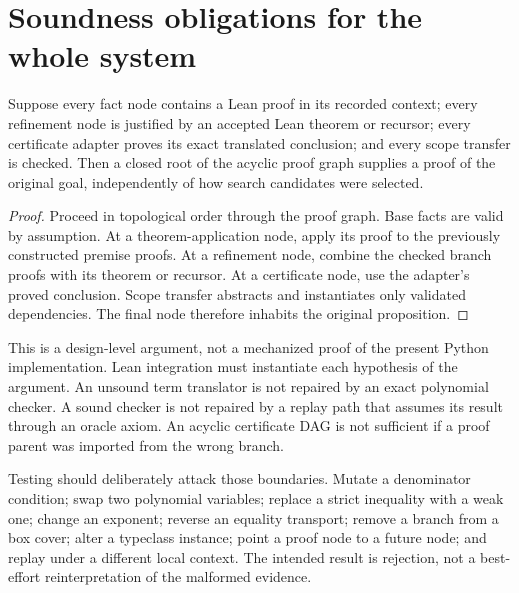 \section{Soundness obligations for the whole system}

\begin{proposition}
Suppose every fact node contains a Lean proof in its recorded context; every
refinement node is justified by an accepted Lean theorem or recursor; every
certificate adapter proves its exact translated conclusion; and every scope
transfer is checked. Then a closed root of the acyclic proof graph supplies a
proof of the original goal, independently of how search candidates were
selected.
\end{proposition}
\begin{proof}
Proceed in topological order through the proof graph. Base facts are valid by
assumption. At a theorem-application node, apply its proof to the previously
constructed premise proofs. At a refinement node, combine the checked branch
proofs with its theorem or recursor. At a certificate node, use the adapter's
proved conclusion. Scope transfer abstracts and instantiates only validated
dependencies. The final node therefore inhabits the original proposition.
\end{proof}

This is a design-level argument, not a mechanized proof of the present Python
implementation. Lean integration must instantiate each hypothesis of the
argument. An unsound term translator is not repaired by an exact polynomial
checker. A sound checker is not repaired by a replay path that assumes its
result through an oracle axiom. An acyclic certificate DAG is not sufficient
if a proof parent was imported from the wrong branch.

Testing should deliberately attack those boundaries. Mutate a denominator
condition; swap two polynomial variables; replace a strict inequality with a
weak one; change an exponent; reverse an equality transport; remove a branch
from a box cover; alter a typeclass instance; point a proof node to a future
node; and replay under a different local context. The intended result is
rejection, not a best-effort reinterpretation of the malformed evidence.
